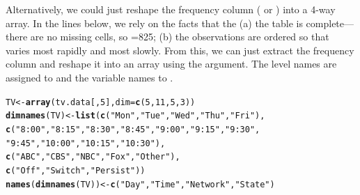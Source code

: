 \documentclass[11pt]{book}\usepackage[]{graphicx}\usepackage[]{color}
\makeatletter
\newcommand{\hlnum}[1]{\textcolor[rgb]{0.686,0.059,0.569}{#1}}%
\newcommand{\hlstr}[1]{\textcolor[rgb]{0.192,0.494,0.8}{#1}}%
\newcommand{\hlstd}[1]{\textcolor[rgb]{0.345,0.345,0.345}{#1}}%
\newcommand{\hlkwb}[1]{\textcolor[rgb]{0.69,0.353,0.396}{#1}}%
\newcommand{\hlkwc}[1]{\textcolor[rgb]{0.333,0.667,0.333}{#1}}%
\newcommand{\hlkwd}[1]{\textcolor[rgb]{0.737,0.353,0.396}{\textbf{#1}}}%
\newenvironment{kframe}{%
 \def\at@end@of@kframe{}%
 \ifinner\ifhmode%
  \def\at@end@of@kframe{\end{minipage}}%
  \begin{minipage}{\columnwidth}%
 \fi\fi%
 \def\FrameCommand##1{\hskip\@totalleftmargin \hskip-\fboxsep
 \colorbox{shadecolor}{##1}\hskip-\fboxsep
     \hskip-\linewidth \hskip-\@totalleftmargin \hskip\columnwidth}%
 \MakeFramed {\advance\hsize-\width
   \@totalleftmargin\z@ \linewidth\hsize
   \@setminipage}}%
 {\par\unskip\endMakeFramed%
 \at@end@of@kframe}
\newenvironment{knitrout}{}{} %
\renewenvironment{knitrout}{\small\renewcommand{\baselinestretch}{.85}}{} %
\makeatother
\begin{document}
Alternatively, we could just reshape the frequency column 
( or ) into
a 4-way array.
In the lines below, we rely on the facts that the
(a) the table is complete--- there are no missing cells,
so =825;
(b) the observations are ordered so that  varies most rapidly and
 most slowly.  From this, we can just extract the frequency column
and reshape it into an array using the  argument.
The level names are assigned to 
and the variable names to .
\begin{knitrout}
\color{fgcolor}\begin{kframe}
\begin{alltt}
\hlstd{TV} \hlkwb{<-} \hlkwd{array}\hlstd{(tv.data[,}\hlnum{5}\hlstd{],} \hlkwc{dim}\hlstd{=}\hlkwd{c}\hlstd{(}\hlnum{5}\hlstd{,}\hlnum{11}\hlstd{,}\hlnum{5}\hlstd{,}\hlnum{3}\hlstd{))}
\hlkwd{dimnames}\hlstd{(TV)} \hlkwb{<-} \hlkwd{list}\hlstd{(}\hlkwd{c}\hlstd{(}\hlstr{"Mon"}\hlstd{,}\hlstr{"Tue"}\hlstd{,}\hlstr{"Wed"}\hlstd{,}\hlstr{"Thu"}\hlstd{,}\hlstr{"Fri"}\hlstd{),}
                \hlkwd{c}\hlstd{(}\hlstr{"8:00"}\hlstd{,}\hlstr{"8:15"}\hlstd{,}\hlstr{"8:30"}\hlstd{,}\hlstr{"8:45"}\hlstd{,}\hlstr{"9:00"}\hlstd{,}\hlstr{"9:15"}\hlstd{,}\hlstr{"9:30"}\hlstd{,}
                  \hlstr{"9:45"}\hlstd{,}\hlstr{"10:00"}\hlstd{,}\hlstr{"10:15"}\hlstd{,}\hlstr{"10:30"}\hlstd{),}
                \hlkwd{c}\hlstd{(}\hlstr{"ABC"}\hlstd{,}\hlstr{"CBS"}\hlstd{,}\hlstr{"NBC"}\hlstd{,}\hlstr{"Fox"}\hlstd{,}\hlstr{"Other"}\hlstd{),}
                \hlkwd{c}\hlstd{(}\hlstr{"Off"}\hlstd{,}\hlstr{"Switch"}\hlstd{,}\hlstr{"Persist"}\hlstd{))}
\hlkwd{names}\hlstd{(}\hlkwd{dimnames}\hlstd{(TV))}\hlkwb{<-}\hlkwd{c}\hlstd{(}\hlstr{"Day"}\hlstd{,} \hlstr{"Time"}\hlstd{,} \hlstr{"Network"}\hlstd{,} \hlstr{"State"}\hlstd{)}
\end{alltt}
\end{kframe}
\end{knitrout}
\end{document}
